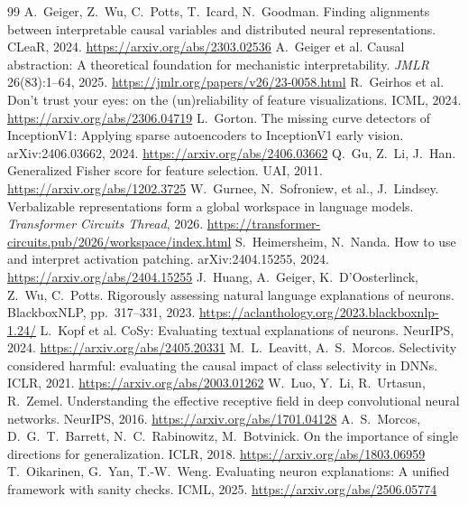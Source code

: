 \documentclass[11pt]{article}
\begin{document}
\begin{thebibliography}{99}
 A.~Geiger, Z.~Wu, C.~Potts, T.~Icard, N.~Goodman. Finding alignments between interpretable causal variables and distributed neural representations. CLeaR, 2024. \url{https://arxiv.org/abs/2303.02536}
 A.~Geiger et al. Causal abstraction: A theoretical foundation for mechanistic interpretability. \emph{JMLR} 26(83):1--64, 2025. \url{https://jmlr.org/papers/v26/23-0058.html}
 R.~Geirhos et al. Don't trust your eyes: on the (un)reliability of feature visualizations. ICML, 2024. \url{https://arxiv.org/abs/2306.04719}
 L.~Gorton. The missing curve detectors of InceptionV1: Applying sparse autoencoders to InceptionV1 early vision. arXiv:2406.03662, 2024. \url{https://arxiv.org/abs/2406.03662}
 Q.~Gu, Z.~Li, J.~Han. Generalized Fisher score for feature selection. UAI, 2011. \url{https://arxiv.org/abs/1202.3725}
 W.~Gurnee, N.~Sofroniew, et al., J.~Lindsey. Verbalizable representations form a global workspace in language models. \emph{Transformer Circuits Thread}, 2026. \url{https://transformer-circuits.pub/2026/workspace/index.html}
 S.~Heimersheim, N.~Nanda. How to use and interpret activation patching. arXiv:2404.15255, 2024. \url{https://arxiv.org/abs/2404.15255}
 J.~Huang, A.~Geiger, K.~D'Oosterlinck, Z.~Wu, C.~Potts. Rigorously assessing natural language explanations of neurons. BlackboxNLP, pp.~317--331, 2023. \url{https://aclanthology.org/2023.blackboxnlp-1.24/}
 L.~Kopf et al. CoSy: Evaluating textual explanations of neurons. NeurIPS, 2024. \url{https://arxiv.org/abs/2405.20331}
 M.~L.~Leavitt, A.~S.~Morcos. Selectivity considered harmful: evaluating the causal impact of class selectivity in DNNs. ICLR, 2021. \url{https://arxiv.org/abs/2003.01262}
 W.~Luo, Y.~Li, R.~Urtasun, R.~Zemel. Understanding the effective receptive field in deep convolutional neural networks. NeurIPS, 2016. \url{https://arxiv.org/abs/1701.04128}
 A.~S.~Morcos, D.~G.~T.~Barrett, N.~C.~Rabinowitz, M.~Botvinick. On the importance of single directions for generalization. ICLR, 2018. \url{https://arxiv.org/abs/1803.06959}
 T.~Oikarinen, G.~Yan, T.-W.~Weng. Evaluating neuron explanations: A unified framework with sanity checks. ICML, 2025. \url{https://arxiv.org/abs/2506.05774}

\end{thebibliography}
\end{document}
